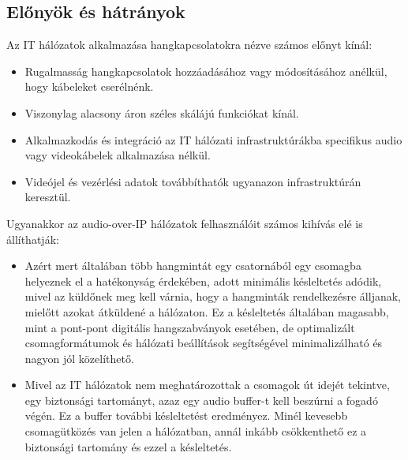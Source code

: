 \subsection{Előnyök és hátrányok}
Az IT hálózatok alkalmazása hangkapcsolatokra nézve számos előnyt kínál:
\begin{itemize}
	\item Rugalmasság hangkapcsolatok hozzáadásához vagy módosításához anélkül,
	      hogy kábeleket cserélnénk.
\end{itemize}
\begin{itemize}
	\item Viszonylag alacsony áron széles skálájú funkciókat kínál.
\end{itemize}
\begin{itemize}
	\item Alkalmazkodás és integráció az IT hálózati infrastruktúrákba
	      specifikus audio vagy videokábelek alkalmazása nélkül.
\end{itemize}
\begin{itemize}
	\item Videójel és vezérlési adatok továbbíthatók ugyanazon infrastruktúrán
	      keresztül.
\end{itemize}
Ugyanakkor az audio-over-IP hálózatok felhasználóit számos kihívás elé is állíthatják:
\begin{itemize}
	\item Azért mert általában több hangmintát egy csatornából egy csomagba helyeznek
	      el a hatékonyság érdekében, adott minimális késleltetés adódik, mivel az
	      küldőnek meg kell várnia, hogy a hangminták rendelkezésre álljanak, mielőtt
	      azokat átküldené a hálózaton. Ez a késleltetés általában magasabb, mint a
	      pont-pont digitális hangszabványok esetében, de optimalizált csomagformátumok és
	      hálózati beállítások segítségével minimalizálható és nagyon jól közelíthető.
\end{itemize}
\begin{itemize}
	\item Mivel az IT hálózatok nem meghatározottak a csomagok út idejét tekintve,
	      egy biztonsági tartományt, azaz egy audio buffer-t kell beszúrni a fogadó végén.
	      Ez a buffer további késleltetést eredményez. Minél kevesebb csomagütközés van
	      jelen a hálózatban, annál inkább csökkenthető ez a biztonsági tartomány és
	      ezzel a késleltetés.
\end{itemize}
